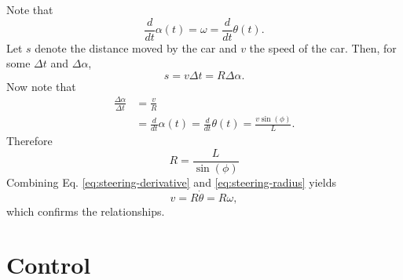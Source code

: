 \documentclass[11pt,titlepage]{report}
\begin{document}
Note that
\[
	\frac{d}{dt} \alpha(t) = \omega = \frac{d}{dt} \theta(t).
\]
Let $s$ denote the distance moved by the car and $v$ the speed of the car. Then, for some $\Delta t$ and $\Delta \alpha$,
\[
	s = v \Delta t = R \Delta \alpha.
\]
Now note that
\begin{align*}
	\frac{\Delta \alpha}{\Delta t} &= \frac{v}{R} \\
	&=\frac{d}{dt} \alpha(t)=\frac{d}{dt} \theta(t) = \frac{v \sin{(\phi)}}{L}.
\end{align*}
Therefore
\begin{equation} \label{eq:steering-radius}
	R = \frac{L}{\sin{(\phi)}}
\end{equation}
Combining Eq. \ref{eq:steering-derivative} and \ref{eq:steering-radius} yields
\[
	v=R \dot{\theta}=R \omega,
\]
which confirms the relationships.

\section*{Control}
\end{document}
